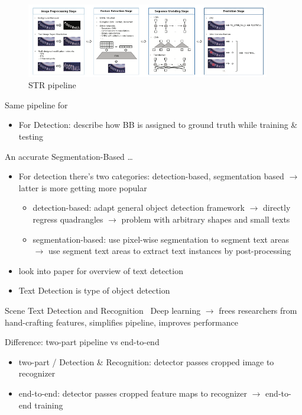 \begin{figure}[h]
    \centering
    \includegraphics[width=0.95\textwidth]{img/Chen-Text-2021-STR-Pipeline.png}
    \caption{STR pipeline~\citep{chen_text_2021}\label{fig:STR-pipeline}}
\end{figure}
Same pipeline for~\cite{baek_what_2019}


\begin{itemize}
    \item For Detection: describe how BB is assigned to ground truth while training \& testing
\end{itemize}

An accurate Segmentation-Based \ldots~\citep{liu_accurate_2020}
\begin{itemize}
    \item For detection there's two categories: detection-based, segmentation based
        $\rightarrow$ latter is more getting more popular
        \begin{itemize}
            \item detection-based: adapt general object detection framework
                $\rightarrow$ directly regress quadrangles
                $\rightarrow$ problem with arbitrary shapes and small texts
            \item segmentation-based: use pixel-wise segmentation to segment text areas
                $\rightarrow$ use segment text areas to extract text instances by post-processing
        \end{itemize}
    \item look into paper for overview of text detection
    \item Text Detection is type of object detection
\end{itemize}

Scene Text Detection and Recognition~\cite{long_scene_2021}
Deep learning $\rightarrow$ frees researchers from hand-crafting features, simplifies pipeline,
    improves performance

Difference: two-part pipeline vs end-to-end
\begin{itemize}
    \item two-part / Detection \& Recognition: detector passes cropped image to recognizer
    \item end-to-end: detector passes cropped feature maps to recognizer $\rightarrow$ end-to-end
            training
\end{itemize}

